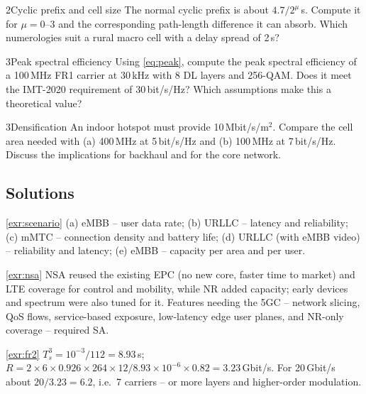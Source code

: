 \documentclass[11pt,a4paper]{article}
\begin{document}
\begin{exercisebox}{2}{Cyclic prefix and cell size}\label{exr:cp}
The normal cyclic prefix is about $4.7/2^\mu$\,\textmu s. Compute it for $\mu = 0$--3 and the corresponding path-length
difference it can absorb. Which numerologies suit a rural macro cell with a delay spread of 2\,\textmu s?
\end{exercisebox}

\begin{exercisebox}{3}{Peak spectral efficiency}\label{exr:se}
Using \cref{eq:peak}, compute the peak spectral efficiency of a 100\,MHz FR1 carrier at 30\,kHz with 8 DL layers and
256-QAM. Does it meet the IMT-2020 requirement of 30\,bit/s/Hz? Which assumptions make this a theoretical
value?
\end{exercisebox}

\begin{exercisebox}{3}{Densification}\label{exr:dense}
An indoor hotspot must provide 10\,Mbit/s/m$^2$. Compare the cell area needed with (a) 400\,MHz at 5\,bit/s/Hz and
(b) 100\,MHz at 7\,bit/s/Hz. Discuss the implications for backhaul and for the core network.
\end{exercisebox}

\subsection*{Solutions}

\begin{solutionbox}{\ref{exr:scenario}}
(a) eMBB -- user data rate; (b) URLLC -- latency and reliability; (c) mMTC -- connection density and battery life;
(d) URLLC (with eMBB video) -- reliability and latency; (e) eMBB -- capacity per area and per user.
\end{solutionbox}

\begin{solutionbox}{\ref{exr:nsa}}
NSA reused the existing EPC (no new core, faster time to market) and LTE coverage for control and mobility, while
NR added capacity; early devices and spectrum were also tuned for it. Features needing the 5GC -- network slicing,
QoS flows, service-based exposure, low-latency edge user planes, and NR-only coverage -- required SA.
\end{solutionbox}

\begin{solutionbox}{\ref{exr:fr2}}
$T_s^{3} = 10^{-3}/112 = 8.93$\,\textmu s; $R = 2\times6\times0.926\times264\times12/8.93\times10^{-6}\times0.82 = 3.23$\,Gbit/s. For
20\,Gbit/s about $20/3.23 = 6.2$, i.e.\ 7 carriers -- or more layers and higher-order modulation.
\end{solutionbox}
\end{document}
